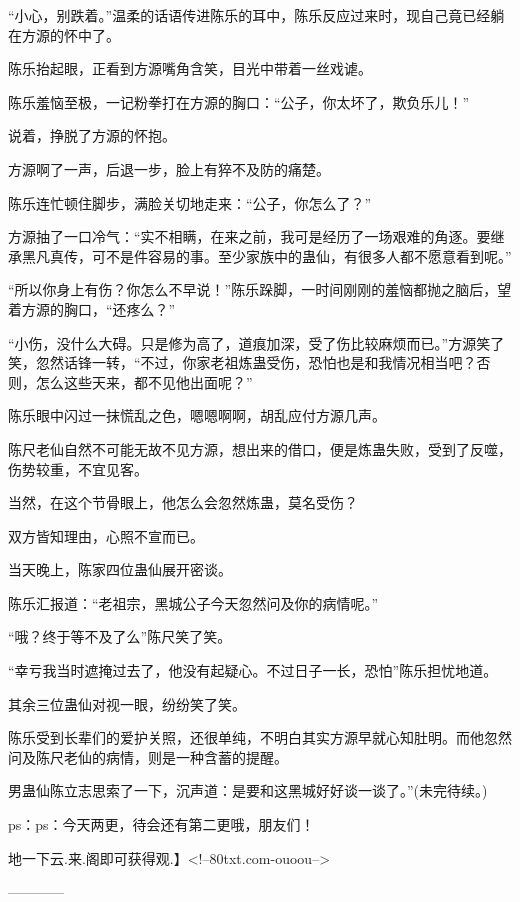 \begin{this_body}
“小心，别跌着。”温柔的话语传进陈乐的耳中，陈乐反应过来时，现自己竟已经躺在方源的怀中了。

陈乐抬起眼，正看到方源嘴角含笑，目光中带着一丝戏谑。

陈乐羞恼至极，一记粉拳打在方源的胸口：“公子，你太坏了，欺负乐儿！”

说着，挣脱了方源的怀抱。

方源啊了一声，后退一步，脸上有猝不及防的痛楚。

陈乐连忙顿住脚步，满脸关切地走来：“公子，你怎么了？”

方源抽了一口冷气：“实不相瞒，在来之前，我可是经历了一场艰难的角逐。要继承黑凡真传，可不是件容易的事。至少家族中的蛊仙，有很多人都不愿意看到呢。”

“所以你身上有伤？你怎么不早说！”陈乐跺脚，一时间刚刚的羞恼都抛之脑后，望着方源的胸口，“还疼么？”

“小伤，没什么大碍。只是修为高了，道痕加深，受了伤比较麻烦而已。”方源笑了笑，忽然话锋一转，“不过，你家老祖炼蛊受伤，恐怕也是和我情况相当吧？否则，怎么这些天来，都不见他出面呢？”

陈乐眼中闪过一抹慌乱之色，嗯嗯啊啊，胡乱应付方源几声。

陈尺老仙自然不可能无故不见方源，想出来的借口，便是炼蛊失败，受到了反噬，伤势较重，不宜见客。

当然，在这个节骨眼上，他怎么会忽然炼蛊，莫名受伤？

双方皆知理由，心照不宣而已。

当天晚上，陈家四位蛊仙展开密谈。

陈乐汇报道：“老祖宗，黑城公子今天忽然问及你的病情呢。”

“哦？终于等不及了么”陈尺笑了笑。

“幸亏我当时遮掩过去了，他没有起疑心。不过日子一长，恐怕”陈乐担忧地道。

其余三位蛊仙对视一眼，纷纷笑了笑。

陈乐受到长辈们的爱护关照，还很单纯，不明白其实方源早就心知肚明。而他忽然问及陈尺老仙的病情，则是一种含蓄的提醒。

男蛊仙陈立志思索了一下，沉声道：是要和这黑城好好谈一谈了。”(未完待续。)

ps：ps：今天两更，待会还有第二更哦，朋友们！

地一下云.来.阁即可获得观.】<!--80txt.com-ouoou-->

------------

\end{this_body}

